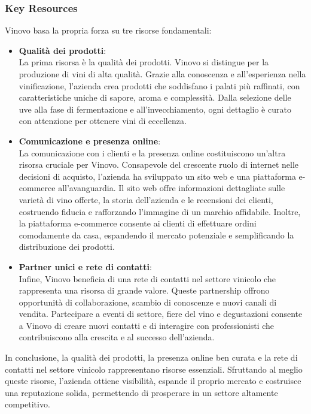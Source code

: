 \documentclass[12pt, a4paper]{article}
\begin{document}
\subsubsection{Key Resources}
Vinovo basa la propria forza su tre risorse fondamentali:
\begin{itemize}
    \item \textbf{Qualità dei prodotti}:\\
          La prima risorsa è la qualità dei prodotti. Vinovo si distingue per la produzione di vini di alta qualità. Grazie alla conoscenza e all'esperienza nella vinificazione, l'azienda crea prodotti che soddisfano i palati più raffinati, con caratteristiche uniche di sapore, aroma e complessità. Dalla selezione delle uve alla fase di fermentazione e all'invecchiamento, ogni dettaglio è curato con attenzione per ottenere vini di eccellenza.
    \item \textbf{Comunicazione e presenza online}:\\
          La comunicazione con i clienti e la presenza online costituiscono un'altra risorsa cruciale per Vinovo. Consapevole del crescente ruolo di internet nelle decisioni di acquisto, l'azienda ha sviluppato un sito web e una piattaforma e-commerce all'avanguardia. Il sito web offre informazioni dettagliate sulle varietà di vino offerte, la storia dell'azienda e le recensioni dei clienti, costruendo fiducia e rafforzando l'immagine di un marchio affidabile. Inoltre, la piattaforma e-commerce consente ai clienti di effettuare ordini comodamente da casa, espandendo il mercato potenziale e semplificando la distribuzione dei prodotti.
    \item \textbf{Partner unici e rete di contatti}:\\
          Infine, Vinovo beneficia di una rete di contatti nel settore vinicolo che rappresenta una risorsa di grande valore. Queste partnership offrono opportunità di collaborazione, scambio di conoscenze e nuovi canali di vendita. Partecipare a eventi di settore, fiere del vino e degustazioni consente a Vinovo di creare nuovi contatti e di interagire con professionisti che contribuiscono alla crescita e al successo dell'azienda.
\end{itemize}
In conclusione, la qualità dei prodotti, la presenza online ben curata e la rete di contatti nel settore vinicolo rappresentano risorse essenziali. Sfruttando al meglio queste risorse, l'azienda ottiene visibilità, espande il proprio mercato e costruisce una reputazione solida, permettendo di prosperare in un settore altamente competitivo.
\end{document}
